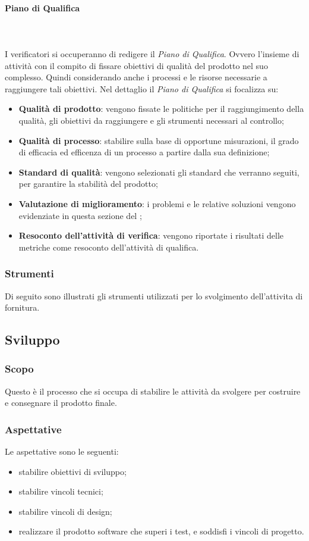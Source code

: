 			\paragraph{Piano di Qualifica} \mbox{} \\ \mbox{} \\
			I verificatori si occuperanno di redigere il \textit{Piano di Qualifica}. Ovvero l'insieme di attività con il compito di fissare obiettivi di qualità del prodotto nel suo complesso. Quindi considerando anche i processi e le risorse necessarie a raggiungere tali obiettivi. Nel dettaglio il \textit{Piano di Qualifica} si focalizza su:
			\begin{itemize}
				\item \textbf{Qualità di prodotto}: vengono fissate le politiche per il raggiungimento della qualità, gli obiettivi da raggiungere e gli strumenti necessari al controllo;
				\item \textbf{Qualità di processo}: stabilire sulla base di opportune misurazioni, il grado di efficacia ed efficenza di un processo a partire dalla sua definizione;
				\item \textbf{Standard di qualità}: vengono selezionati gli standard che verranno seguiti, per garantire la stabilità del prodotto;
				\item \textbf{Valutazione di miglioramento}: i problemi e le relative soluzioni vengono evidenziate in questa sezione del ;
				\item \textbf{Resoconto dell'attività di verifica}: vengono riportate i risultati delle metriche come resoconto dell'attività di qualifica.
			\end{itemize}
		\subsubsection{Strumenti}
		Di seguito sono illustrati gli strumenti utilizzati per lo svolgimento dell'attivita di fornitura.

	\subsection{Sviluppo}
		\subsubsection{Scopo}Questo è il processo che si occupa di stabilire le attività da svolgere per costruire e consegnare il prodotto finale.
		\subsubsection{Aspettative}
		Le aspettative sono le seguenti:
			\begin{itemize}
				\item stabilire obiettivi di sviluppo;
				\item stabilire vincoli tecnici;
				\item stabilire vincoli di design;
				\item realizzare il prodotto software che superi i test, e soddisfi i vincoli di progetto.
			\end{itemize}
